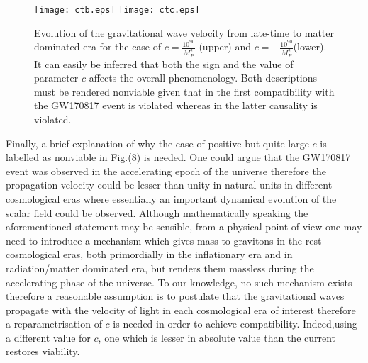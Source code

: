 \documentclass[aps,prd,twocolumn,groupedaddress,showpacs,nofootinbib,amssymb]{revtex4-2}
\begin{document}
\begin{figure}[h!]
\centering
\texttt{[image: ctb.eps]}
\texttt{[image: ctc.eps]}
\caption{Evolution of the gravitational wave velocity from late-time to matter dominated era for the case of $c=\frac{10^{90}}{M_P^2}$ (upper) and $c=-\frac{10^{90}}{M_P^2}$(lower). It can easily be inferred that both the sign and the value of parameter $c$ affects the overall phenomenology. Both descriptions must be rendered nonviable given that in the first compatibility with the GW170817 event is violated whereas in the latter causality is violated.}
\label{plot8}
\end{figure}

Finally, a brief explanation of why the case of positive but quite large $c$ is labelled as nonviable in Fig.(8) is needed. One could argue that the GW170817 event was observed in the accelerating epoch of the universe therefore the propagation velocity could be lesser than unity in natural units in different cosmological eras where essentially an important dynamical evolution of the scalar field could be observed. Although mathematically speaking the aforementioned statement may be sensible, from a physical point of view one may need to introduce a mechanism which gives mass to gravitons in the rest cosmological eras, both primordially in the inflationary era and in radiation/matter dominated era, but renders them massless during the accelerating phase of the universe. To our knowledge, no such mechanism exists therefore a reasonable assumption is to postulate that the gravitational waves propagate with the velocity of light in each cosmological era of interest therefore a reparametrisation of $c$ is needed in order to achieve compatibility. Indeed,using a different value for $c$, one which is lesser in absolute value than the current restores viability.  
\end{document}
